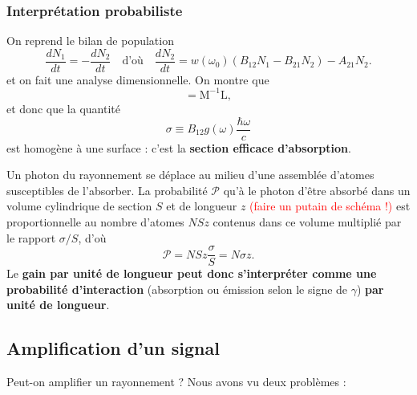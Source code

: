 \documentclass[11pt,a4paper]{report}
\begin{document}
\subsubsection*{Interprétation probabiliste}

On reprend le bilan de population
\begin{equation}
	\frac{dN_1}{dt} = - \frac{dN_2}{dt} \quad\text{d'où}\quad
	\boxed{\frac{dN_2}{dt} = w(\omega_0)\left(B_{12} N_1 - B_{21}N_2\right) - A_{21}N_2}.
\end{equation}
et on fait une analyse dimensionnelle. On montre que
\begin{equation}
	[B] = \text{M}^{-1}\text{L},
\end{equation}
et donc que la quantité
\begin{equation}
	\boxed{\sigma \equiv B_{12}g(\omega) \frac{\hbar \omega}{c}}
\end{equation}
est homogène à une surface : c'est la \textbf{section efficace d'absorption}.

Un photon du rayonnement se déplace au milieu d'une assemblée d'atomes susceptibles de l'absorber. La probabilité $\mathcal{P}$ qu'à le photon d'être absorbé dans un volume cylindrique de section $S$ et de longueur $z$ \textcolor{red}{(faire un putain de schéma !)} est proportionnelle au nombre d'atomes $NSz$ contenus dans ce volume multiplié par le rapport $\sigma/S$, d'où
\begin{equation}
	\mathcal{P} = NSz \frac{\sigma}{S} = N \sigma z.
\end{equation}
Le \textbf{gain par unité de longueur peut donc s'interpréter comme une probabilité d'interaction} (absorption ou émission selon le signe de $\gamma$) \textbf{par unité de longueur}.

\newpage
\subsection{Amplification d'un signal}

Peut-on amplifier un rayonnement ? Nous avons vu deux problèmes :\\
\end{document}
